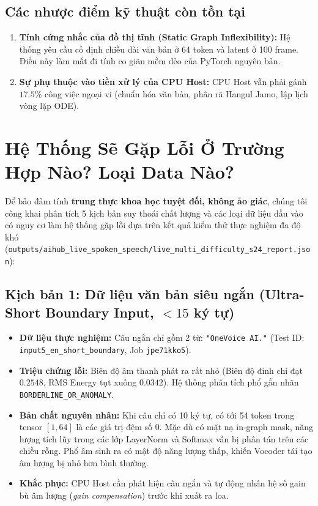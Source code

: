 \documentclass[11pt,a4paper,oneside,table]{report}
\begin{document}
\subsection{Các nhược điểm kỹ thuật còn tồn tại}
\begin{enumerate}
    \item \textbf{Tính cứng nhắc của đồ thị tĩnh (Static Graph Inflexibility):} Hệ thống yêu cầu cố định chiều dài văn bản ở 64 token và latent ở 100 frame. Điều này làm mất đi tính co giãn mềm dẻo của PyTorch nguyên bản.
    \item \textbf{Sự phụ thuộc vào tiền xử lý của CPU Host:} CPU Host vẫn phải gánh $17.5\%$ công việc ngoại vi (chuẩn hóa văn bản, phân rã Hangul Jamo, lập lịch vòng lặp ODE).
\end{enumerate}

\section{Hệ Thống Sẽ Gặp Lỗi Ở Trường Hợp Nào? Loại Data Nào?}
\label{sec:failure_modes_and_vulnerabilities}

Để bảo đảm tính \textbf{trung thực khoa học tuyệt đối, không ảo giác}, chúng tôi công khai phân tích 5 kịch bản suy thoái chất lượng và các loại dữ liệu đầu vào có nguy cơ làm hệ thống gặp lỗi dựa trên kết quả kiểm thử thực nghiệm đa độ khó (\texttt{outputs/aihub\_live\_spoken\_speech/live\_multi\_difficulty\_s24\_report.json}):

\subsection{Kịch bản 1: Dữ liệu văn bản siêu ngắn (Ultra-Short Boundary Input, $< 15$ ký tự)}
\begin{itemize}
    \item \textbf{Dữ liệu thực nghiệm:} Câu ngắn chỉ gồm 2 từ: \texttt{"OneVoice AI."} (Test ID: \texttt{input5\_en\_short\_boundary}, Job \texttt{jpe71kko5}).
    \item \textbf{Triệu chứng lỗi:} Biên độ âm thanh phát ra rất nhỏ (Biên độ đỉnh chỉ đạt $0.2548$, RMS Energy tụt xuống $0.0342$). Hệ thống phân tích phổ gắn nhãn \texttt{BORDERLINE\_OR\_ANOMALY}.
    \item \textbf{Bản chất nguyên nhân:} Khi câu chỉ có 10 ký tự, có tới 54 token trong tensor $[1, 64]$ là các giá trị đệm số 0. Mặc dù có mặt nạ in-graph mask, năng lượng tích lũy trong các lớp LayerNorm và Softmax vẫn bị phân tán trên các chiều rỗng. Phổ âm sinh ra có mật độ năng lượng thấp, khiến Vocoder tái tạo âm lượng bị nhỏ hơn bình thường.
    \item \textbf{Khắc phục:} CPU Host cần phát hiện câu ngắn và tự động nhân hệ số gain bù âm lượng (\textit{gain compensation}) trước khi xuất ra loa.
\end{itemize}
\end{document}
